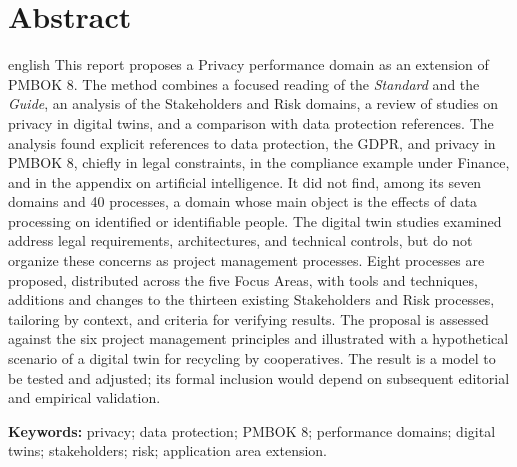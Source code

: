 \documentclass[11pt,a4paper]{article}
\newcommand{\SingleSpacing}{}
\newcommand{\onelineskip}{\baselineskip}
\newenvironment{resumo}[1][Resumo]{\section*{#1}\noindent\ignorespaces}{\bigskip}
\begin{document}
\begin{resumo}[Abstract]
\begin{otherlanguage*}{english}
This report proposes a Privacy performance domain as an extension of PMBOK 8. The method combines a focused reading of the \textit{Standard} and the \textit{Guide}, an analysis of the Stakeholders and Risk domains, a review of studies on privacy in digital twins, and a comparison with data protection references. The analysis found explicit references to data protection, the GDPR, and privacy in PMBOK 8, chiefly in legal constraints, in the compliance example under Finance, and in the appendix on artificial intelligence. It did not find, among its seven domains and 40 processes, a domain whose main object is the effects of data processing on identified or identifiable people. The digital twin studies examined address legal requirements, architectures, and technical controls, but do not organize these concerns as project management processes. Eight processes are proposed, distributed across the five Focus Areas, with tools and techniques, additions and changes to the thirteen existing Stakeholders and Risk processes, tailoring by context, and criteria for verifying results. The proposal is assessed against the six project management principles and illustrated with a hypothetical scenario of a digital twin for recycling by cooperatives. The result is a model to be tested and adjusted; its formal inclusion would depend on subsequent editorial and empirical validation.

\vspace{\onelineskip}
\noindent\textbf{Keywords:} privacy; data protection; PMBOK 8; performance domains; digital twins; stakeholders; risk; application area extension.
\end{otherlanguage*}
\end{resumo}
\clearpage

\begingroup
\SingleSpacing
\end{document}
